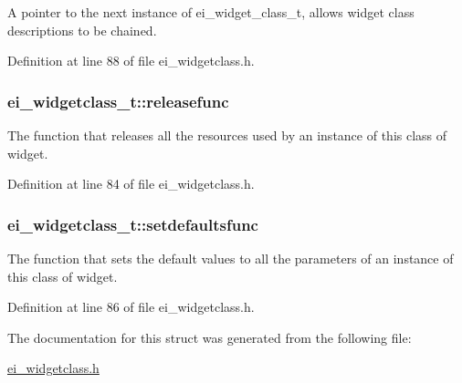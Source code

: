 A pointer to the next instance of ei\_\-widget\_\-class\_\-t, allows widget class descriptions to be chained. 

Definition at line 88 of file ei\_\-widgetclass.h.\hypertarget{structei__widgetclass__t_aebe6139b31816495e866c99ec3e83de6}{
\subsubsection[{releasefunc}]{ {\bf ei\_\-widgetclass\_\-t::releasefunc}}}
\label{structei__widgetclass__t_aebe6139b31816495e866c99ec3e83de6}


The function that releases all the resources used by an instance of this class of widget. 

Definition at line 84 of file ei\_\-widgetclass.h.\hypertarget{structei__widgetclass__t_a5fec706eefca10172d897cf61b268510}{
\subsubsection[{setdefaultsfunc}]{ {\bf ei\_\-widgetclass\_\-t::setdefaultsfunc}}}
\label{structei__widgetclass__t_a5fec706eefca10172d897cf61b268510}


The function that sets the default values to all the parameters of an instance of this class of widget. 

Definition at line 86 of file ei\_\-widgetclass.h.

The documentation for this struct was generated from the following file:\begin{DoxyCompactItemize}
\item 
\hyperlink{ei__widgetclass_8h}{ei\_\-widgetclass.h}\end{DoxyCompactItemize}
